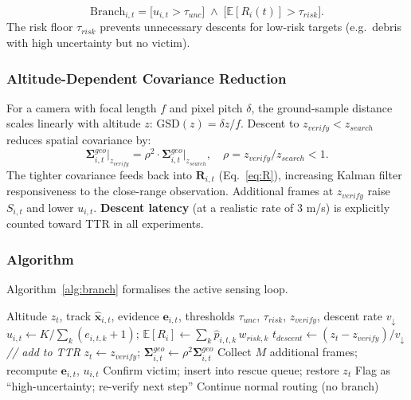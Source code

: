 \documentclass[11pt,a4paper]{article}
\begin{document}
\begin{equation}
  \text{Branch}_{i,t} =
  \bigl[u_{i,t} > \tau_{unc}\bigr]
  \;\wedge\;
  \bigl[\mathbb{E}[R_i(t)] > \tau_{risk}\bigr].
  \label{eq:branch}
\end{equation}
The risk floor $\tau_{risk}$ prevents unnecessary descents for low-risk targets
(e.g.\ debris with high uncertainty but no victim).

\subsubsection{Altitude-Dependent Covariance Reduction}

For a camera with focal length $f$ and pixel pitch $\delta$, the
ground-sample distance scales linearly with altitude $z$:
$\text{GSD}(z) = \delta z / f$.
Descent to $z_{verify} < z_{search}$ reduces spatial covariance by:
\begin{equation}
  \boldsymbol{\Sigma}^{geo}_{i,t}\big|_{z_{verify}}
  = \rho^2 \cdot \boldsymbol{\Sigma}^{geo}_{i,t}\big|_{z_{search}},
  \quad \rho = z_{verify}/z_{search} < 1.
  \label{eq:cov_reduce}
\end{equation}
The tighter covariance feeds back into $\mathbf{R}_{i,t}$ (Eq.~\ref{eq:R}),
increasing Kalman filter responsiveness to the close-range observation.
Additional frames at $z_{verify}$ raise $S_{i,t}$ and lower $u_{i,t}$.
\textbf{Descent latency} (at a realistic rate of 3 m/s) is explicitly
counted toward TTR in all experiments.

\subsubsection{Algorithm}

Algorithm~\ref{alg:branch} formalises the active sensing loop.

\begin{algorithm}[t]
\caption{Active Sensing Branch for Target $i$ at Step $t$}
\label{alg:branch}
\begin{algorithmic}[1]
\Require Altitude $z_t$, track $\hat{\mathbf{x}}_{i,t}$,
         evidence $\mathbf{e}_{i,t}$, thresholds $\tau_{unc}$, $\tau_{risk}$,
         $z_{verify}$, descent rate $v_\downarrow$
\State $u_{i,t} \leftarrow K / \sum_k(e_{i,t,k}+1)$; \quad
       $\mathbb{E}[R_i] \leftarrow \sum_k \hat{p}_{i,t,k}\,w_{risk,k}$
  \State $t_{descent} \leftarrow (z_t - z_{verify})/v_\downarrow$
         \quad\textit{// add to TTR}
  \State $z_t \leftarrow z_{verify}$; \quad
         $\boldsymbol{\Sigma}^{geo}_{i,t}
         \leftarrow \rho^2 \boldsymbol{\Sigma}^{geo}_{i,t}$
  \State Collect $M$ additional frames; recompute $\mathbf{e}_{i,t}$,
         $u_{i,t}$
    \State Confirm victim; insert into rescue queue; restore $z_t$
  \Else
    \State Flag as ``high-uncertainty; re-verify next step''
  \EndIf
\Else
  \State Continue normal routing (no branch)
\EndIf
\end{algorithmic}
\end{algorithm}
\end{document}
